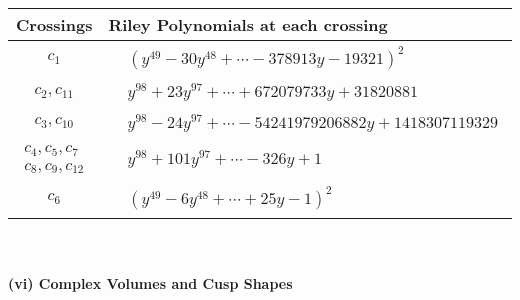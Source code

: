 \documentclass[1p]{elsarticle_modified}
\theoremstyle{definition}
\begin{document}
\begin{tabular}{m{50pt}|m{274pt}}
Crossings & \hspace{64pt}Riley Polynomials at each crossing \\
\hline $$\begin{aligned}c_{1}\end{aligned}$$&$\begin{aligned}
&(y^{49}-30 y^{48}+\cdots-378913 y-19321)^{2}
\end{aligned}$\\
\hline $$\begin{aligned}c_{2},c_{11}\end{aligned}$$&$\begin{aligned}
&y^{98}+23 y^{97}+\cdots+672079733 y+31820881
\end{aligned}$\\
\hline $$\begin{aligned}c_{3},c_{10}\end{aligned}$$&$\begin{aligned}
&y^{98}-24 y^{97}+\cdots-54241979206882 y+1418307119329
\end{aligned}$\\
\hline $$\begin{aligned}c_{4},c_{5},c_{7}\\c_{8},c_{9},c_{12}\end{aligned}$$&$\begin{aligned}
&y^{98}+101 y^{97}+\cdots-326 y+1
\end{aligned}$\\
\hline $$\begin{aligned}c_{6}\end{aligned}$$&$\begin{aligned}
&(y^{49}-6 y^{48}+\cdots+25 y-1)^{2}
\end{aligned}$\\
\hline
\end{tabular}\\~\\
\newpage\flushleft \textbf{(vi) Complex Volumes and Cusp Shapes}
\end{document}
